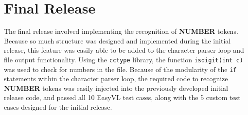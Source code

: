 \documentclass[]{article}
\begin{document}
\section{Final Release}
The final release involved implementing the recognition of \textbf{NUMBER} tokens. Because so much structure was designed and implemented during the initial release, this feature was easily able to be added to the character parser loop and file output functionality. Using the \texttt{cctype} library, the function \texttt{isdigit(int c)} was used to check for numbers in the file. Because of the modularity of the \texttt{if} statements within the character parser loop, the required code to recognize \textbf{NUMBER} tokens was easily injected into the previously developed initial release code, and passed all 10 EasyVL test cases, along with the 5 custom test cases designed for the initial release.
\end{document}
